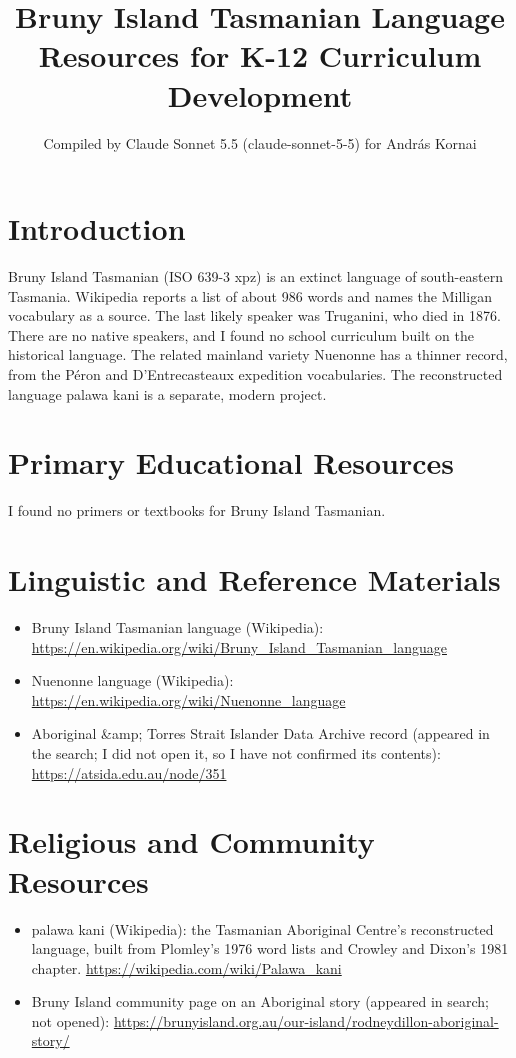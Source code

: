 \documentclass[12pt]{article}
\title{Bruny Island Tasmanian Language Resources for K-12 Curriculum Development}
\author{Compiled by Claude Sonnet 5.5 (claude-sonnet-5-5) for Andr\'as Kornai}
\date{}
\begin{document}
\maketitle

\section{Introduction}
Bruny Island Tasmanian (ISO 639-3 xpz) is an extinct language of south-eastern Tasmania. Wikipedia reports a list of about 986 words and names the Milligan vocabulary as a source. The last likely speaker was Truganini, who died in 1876. There are no native speakers, and I found no school curriculum built on the historical language. The related mainland variety Nuenonne has a thinner record, from the Péron and D'Entrecasteaux expedition vocabularies. The reconstructed language palawa kani is a separate, modern project.

\section{Primary Educational Resources}
I found no primers or textbooks for Bruny Island Tasmanian.

\section{Linguistic and Reference Materials}
\begin{itemize}
\item Bruny Island Tasmanian language (Wikipedia): \url{https://en.wikipedia.org/wiki/Bruny_Island_Tasmanian_language}
\item Nuenonne language (Wikipedia): \url{https://en.wikipedia.org/wiki/Nuenonne_language}
\item Aboriginal \&amp; Torres Strait Islander Data Archive record (appeared in the search; I did not open it, so I have not confirmed its contents): \url{https://atsida.edu.au/node/351}
\end{itemize}

\section{Religious and Community Resources}
\begin{itemize}
\item palawa kani (Wikipedia): the Tasmanian Aboriginal Centre's reconstructed language, built from Plomley's 1976 word lists and Crowley and Dixon's 1981 chapter. \url{https://wikipedia.com/wiki/Palawa_kani}
\item Bruny Island community page on an Aboriginal story (appeared in search; not opened): \url{https://brunyisland.org.au/our-island/rodneydillon-aboriginal-story/}
\end{itemize}
\end{document}
